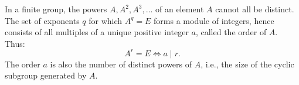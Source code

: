 In a finite group, the powers $A, A^2, A^3, \ldots$ of an element $A$ cannot all be distinct. The set of exponents $q$ for which $A^q = E$ forms a module of integers, hence consists of all multiples of a unique positive integer $a$, called the order of $A$. Thus:
$$A^r = E \iff a \mid r.$$
The order $a$ is also the number of distinct powers of $A$, i.e., the size of the cyclic subgroup generated by $A$.
